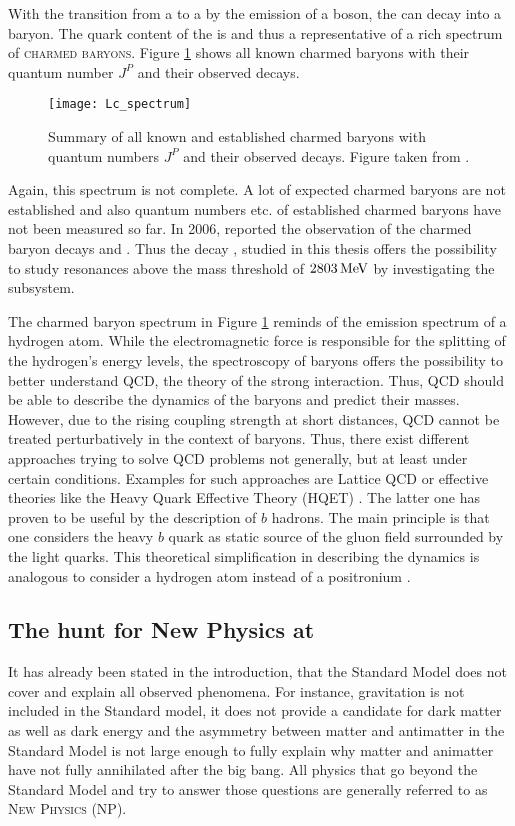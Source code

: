 With the transition from a \bquark to a \cquark by the emission of a \Wm boson, the \Lb can decay into a \Lc baryon.
The quark content of the \Lc is \uquark\dquark\cquark and thus a representative of a rich spectrum of \textsc{charmed baryons}.
Figure \ref{fig:Lc_spectrum} shows all known charmed baryons with their quantum number $J^P$ and their observed decays.
\begin{figure}[tb]
    \centering
	\texttt{[image: Lc\_spectrum]}	
	\caption{Summary of all known and established charmed baryons with quantum numbers $J^P$ and their observed decays. Figure taken from \cite{PDG}.}
	\label{fig:Lc_spectrum}
\end{figure}
Again, this spectrum is not complete.
A lot of expected charmed baryons are not established and also quantum numbers etc. of established charmed baryons have not been measured so far.
In 2006, \babar reported the observation of the charmed baryon decays \decay{\LcResI}{\Dz\proton} and \decay{\LcResII}{\Dz\proton} \cite{BaBar_D0p}.
Thus the decay \LbToDpmunuX, studied in this thesis offers the possibility to study \Lc resonances above the \Dz\proton mass threshold of $2803\mathrm{\,Me\kern -0.1em V}$ by investigating the \Dz\proton subsystem.

The charmed baryon spectrum in Figure \ref{fig:Lc_spectrum} reminds of the emission spectrum of a hydrogen atom.
While the electromagnetic force is responsible for the splitting of the hydrogen's energy levels, the spectroscopy of baryons offers the possibility to better understand QCD, the theory of the strong interaction.
Thus, QCD should be able to describe the dynamics of the baryons and predict their masses.
However, due to the rising coupling strength \as at short distances, QCD cannot be treated perturbatively in the context of baryons.
Thus, there exist different approaches trying to solve QCD problems not generally, but at least under certain conditions.
Examples for such approaches are Lattice QCD \cite{LatticeQCD} or effective theories like the Heavy Quark Effective Theory (HQET) \cite{HQET_Introduction}.
The latter one has proven to be useful by the description of $b$ hadrons.
The main principle is that one considers the heavy $b$ quark as static source of the gluon field surrounded by the light quarks.
This theoretical simplification in describing the dynamics is analogous to consider a hydrogen atom instead of a positronium \cite{HQET_Introduction}.

\subsection{The hunt for New Physics at \lhcb}
It has already been stated in the introduction, that the Standard Model does not cover and explain all observed phenomena.
For instance, gravitation is not included in the Standard model, it does not provide a candidate for dark matter as well as dark energy and the asymmetry between matter and antimatter in the Standard Model is not large enough to fully explain why matter and animatter have not fully annihilated after
the big bang.
All physics that go beyond the Standard Model and try to answer those questions are generally referred to as \textsc{New Physics (NP)}.

